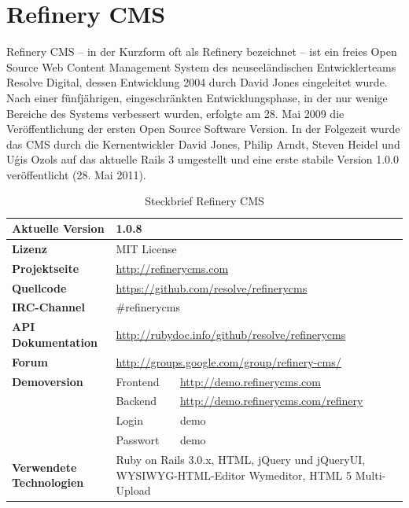 \section{Refinery CMS}
Refinery CMS -- in der Kurzform oft als Refinery bezeichnet -- ist ein freies Open Source Web Content Management System des neuseeländischen Entwicklerteams Resolve Digital, dessen Entwicklung 2004 durch David Jones eingeleitet wurde. Nach einer fünfjährigen, eingeschränkten Entwicklungsphase, in der nur wenige Bereiche des Systems verbessert wurden, erfolgte am 28. Mai 2009 die Veröffentlichung der ersten Open Source Software Version. In der Folgezeit wurde das CMS durch die Kernentwickler David Jones, Philip Arndt, Steven Heidel und U\'{g}is Ozols auf das aktuelle Rails 3 umgestellt und eine erste stabile Version 1.0.0 veröffentlicht (28. Mai 2011).
\begin{table}[!h]
\caption{Steckbrief Refinery CMS}
\begin{tabular}[!ht]{|l|l|l|}
\hline
\textbf{Aktuelle Version} & \multicolumn{2}{p{10cm}|}{1.0.8} \\
\hline
\textbf{Lizenz} & \multicolumn{2}{p{10cm}|}{MIT License} \\
\hline
\textbf{Projektseite} & \multicolumn{2}{p{10cm}|}{\href{http://refinerycms.com}{http://refinerycms.com}} \\
\hline
\textbf{Quellcode} & \multicolumn{2}{p{10cm}|}{\href{https://github.com/resolve/refinerycms}{https://github.com/resolve/refinerycms}} \\
\hline
\textbf{IRC-Channel} & \multicolumn{2}{p{10cm}|}{\#refinerycms} \\
\hline
\textbf{API Dokumentation} & \multicolumn{2}{p{10cm}|}{\href{http://rubydoc.info/github/resolve/refinerycms}{http://rubydoc.info/github/resolve/refinerycms}} \\
\hline
\textbf{Forum} & \multicolumn{2}{p{10cm}|}{\href{http://groups.google.com/group/refinery-cms/}{http://groups.google.com/group/refinery-cms/}} \\
\hline
\textbf{Demoversion} & Frontend & \href{http://demo.refinerycms.com}{http://demo.refinerycms.com} \\
\cline{2-3}
& Backend & \href{http://demo.refinerycms.com/refinery}{http://demo.refinerycms.com/refinery} \\
\cline{2-3}
& Login & demo \\
\cline{2-3}
& Passwort & demo \\
\hline
\textbf{Verwendete Technologien} & \multicolumn{2}{p{10cm}|}{Ruby on Rails 3.0.x, HTML, jQuery und jQueryUI, WYSIWYG-HTML-Editor Wymeditor, HTML 5 Multi-Upload} \\

\end{tabular}
\end{table}

